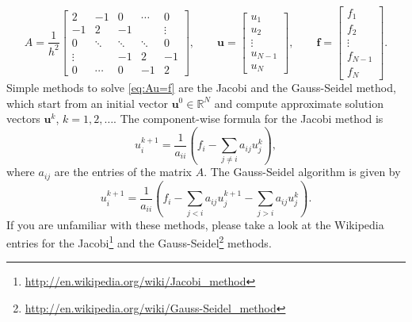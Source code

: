 \documentclass[11pt]{article}
\newcommand{\bs}{\boldsymbol}
\begin{document}
\begin{enumerate}
\begin{equation*}
  A = \frac{1}{h^2}
    \begin{bmatrix}
    2 & -1 & 0 & \cdots & 0\\
    -1 & 2 & -1 &  & \vdots\\
    0 & \ddots & \ddots & \ddots &0\\
    \vdots &  & -1 & 2 & -1\\
    0 & \cdots & 0 & -1 & 2
    \end{bmatrix}\!\!,\qquad
    \bs u = 
    \begin{bmatrix}
      u_1\\u_2\\ \vdots \\ u_{N-1}\\u_N
    \end{bmatrix}\!\!,
    \qquad
    \bs f  =
    \begin{bmatrix}
      f_1\\f_2\\ \vdots \\ f_{N-1}\\f_N
    \end{bmatrix}\!.
  \end{equation*}
  Simple methods to solve \eqref{eq:Au=f} are the Jacobi and the
  Gauss-Seidel method, which start from an initial vector $\bs u^0\in
  \mathbb R^N$ and compute approximate solution vectors $\bs u^k$,
  $k=1,2,\ldots$. The component-wise formula for the Jacobi method is
  \begin{equation*}
    u_i^{k+1} = \frac{1}{a_{ii}}\left(f_i - \sum_{j\not=i}a_{ij}u_j^k\right),
  \end{equation*}
  where $a_{ij}$ are the entries of the matrix $A$.  The Gauss-Seidel
  algorithm is given by
  \begin{equation*}
    u_i^{k+1} = \frac{1}{a_{ii}}\left(f_i - \sum_{j<i}a_{ij}u_j^{k+1}
      - \sum_{j>i}a_{ij}u_j^{k}\right).
  \end{equation*}
  If you are unfamiliar with these methods, please take a look at the
  Wikipedia entries for the
  Jacobi\footnote{\url{http://en.wikipedia.org/wiki/Jacobi_method}}
  and the
  Gauss-Seidel\footnote{\url{http://en.wikipedia.org/wiki/Gauss-Seidel_method}}
  methods.


\end{enumerate}
\end{document}

